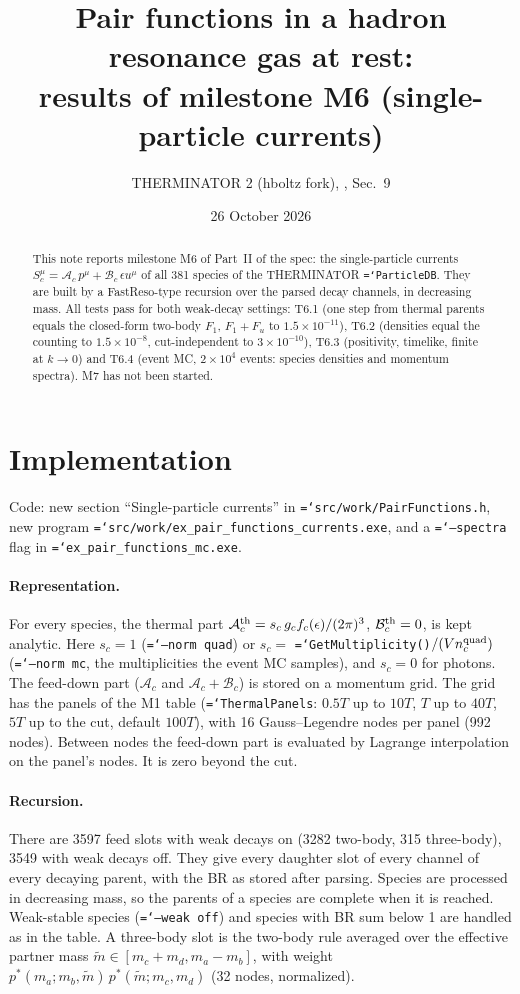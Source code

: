 \documentclass[11pt,a4paper]{article}
\title{Pair functions in a hadron resonance gas at rest:\\ results of milestone M6
(single-particle currents)}
\author{THERMINATOR 2 (hboltz fork), \code{src/work/hrg\_pair\_density\_spec.md}, Sec.~9}
\date{26 October 2026}
\newcommand{\code}[1]{\texttt{\hyphenchar\font=`\-#1}}
\begin{document}
\maketitle

\begin{abstract}
\noindent
This note reports milestone M6 of Part~II of the spec: the single-particle currents
$S_c^\mu=\mathcal A_c\,p^\mu+\mathcal B_c\,\epsilon u^\mu$ of all 381 species of the THERMINATOR
\code{ParticleDB}. They are built by a FastReso-type recursion over the parsed decay channels, in
decreasing mass. All tests pass for both weak-decay settings: T6.1 (one step from thermal parents
equals the closed-form two-body $F_1$, $F_1+F_u$ to $1.5\times10^{-11}$), T6.2 (densities equal the
counting to $1.5\times10^{-8}$, cut-independent to $3\times10^{-10}$), T6.3 (positivity, timelike,
finite at $k\to0$) and T6.4 (event MC, $2\times10^4$ events: species densities and momentum spectra).
M7 has not been started.
\end{abstract}

\section{Implementation}
Code: new section ``Single-particle currents'' in \code{src/work/PairFunctions.h}, new program
\code{src/work/ex\_pair\_functions\_currents.exe}, and a \code{--spectra} flag in
\code{ex\_pair\_functions\_mc.exe}.

\paragraph{Representation.} For every species, the thermal part
$\mathcal A^{\rm th}_c=s_c\,g_cf_c(\epsilon)/(2\pi)^3$, $\mathcal B^{\rm th}_c=0$, is kept analytic.
Here $s_c=1$ (\code{--norm quad}) or $s_c=$ \code{GetMultiplicity()}$/(Vn_c^{\rm quad})$
(\code{--norm mc}, the multiplicities the event MC samples), and $s_c=0$ for photons. The feed-down
part ($\mathcal A_c$ and $\mathcal A_c+\mathcal B_c$) is stored on a momentum grid. The grid has the
panels of the M1 table (\code{ThermalPanels}: $0.5T$ up to $10T$, $T$ up to $40T$, $5T$ up to the
cut, default $100T$), with 16 Gauss--Legendre nodes per panel (992 nodes). Between nodes the feed-down
part is evaluated by Lagrange interpolation on the panel's nodes. It is zero beyond the cut.

\paragraph{Recursion.} There are 3597 feed slots with weak decays on (3282 two-body, 315
three-body), 3549 with weak decays off. They give every daughter slot of every channel of every
decaying parent, with the BR as stored after parsing. Species are processed in decreasing mass, so
the parents of a species are complete when it is reached. Weak-stable species (\code{--weak off}) and
species with BR sum below 1 are handled as in the table. A three-body slot is the two-body rule
averaged over the effective partner mass $\tilde m\in[m_c+m_d,m_a-m_b]$, with weight
$p^*(m_a;m_b,\tilde m)\,p^*(\tilde m;m_c,m_d)$ (32 nodes, normalized).
\end{document}
